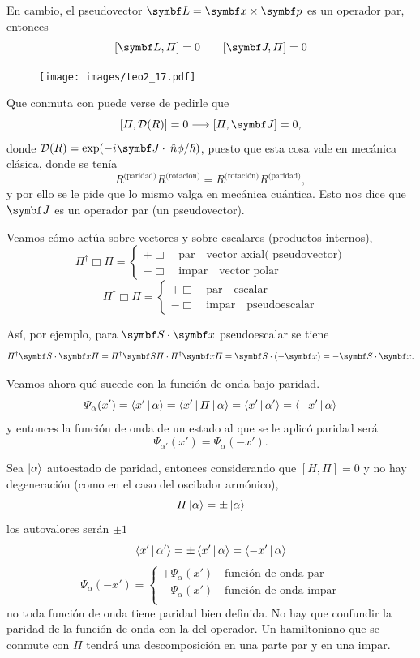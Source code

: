 \documentclass[10pt,oneside]{CBFT_book}
\begin{document}
En cambio, el pseudovector $\vb{L}=\vb{x}\times\vb{p}$ es un operador par, entonces 
\[
	[\vb{L},\Pi] = 0 \qquad [\vb{J},\Pi] = 0
\]
\begin{figure}[htb]
	\begin{center}
	\texttt{[image: images/teo2\_17.pdf]}
	\end{center}
	\caption{}
\end{figure} 
Que conmuta con  puede verse de pedirle que 
\[
	[\Pi,\mathcal{D}(R)] = 0 \longrightarrow [\Pi,\vb{J}] = 0 ,
\]
donde $\mathcal{D}(R) = \exp(- i \vb J \cdot \nver \phi / \hbar)$, puesto que esta cosa vale en 
mecánica clásica, donde se tenía
\[
	R^{\text{(paridad)}}R^{\text{(rotación)}} = R^{\text{(rotación)}} R^{\text{(paridad)}},
\]
y por ello se le pide que lo mismo valga en mecánica cuántica.
Esto nos dice que $\vb J$ es un operador par (un pseudovector).

Veamos cómo actúa sobre vectores y sobre escalares (productos internos),
\[
	\Pi^\dagger \Box \Pi =  \begin{cases} +{\Box} \quad \text{par}\quad\text{vector axial( 
	pseudovector)}\\  -\Box \quad \text{impar} \quad \text{vector polar} \end{cases}
\]
\[
	\Pi^\dagger \Box \Pi =  \begin{cases} +\Box \quad \text{par}\quad\text{escalar}\\
	-\Box \quad \text{impar} \quad \text{pseudoescalar} \end{cases}
\]

Así, por ejemplo, para $\vb{S}\cdot\vb{x}$ pseudoescalar se tiene
\[
	\Pi^\dagger \vb{S}\cdot\vb{x} \Pi = \Pi^\dagger \vb{S}\Pi \cdot\Pi^\dagger\vb{x} \Pi =
	\vb{S}\cdot(-\vb{x}) = -\vb{S}\cdot\vb{x}.
\]

Veamos ahora qué sucede con la función de onda bajo paridad.
\[
	\Psi_\alpha(x') = \Braket{x'|\alpha} = \Braket{x'|\Pi|\alpha} = \Braket{x'|\alpha'} = 
	\Braket{-x'|\alpha}
\]
y entonces la función de onda de un estado al que se le aplicó paridad será 
\[
	\Psi_{\alpha'}(x') = \Psi_\alpha(-x').
\]

Sea $\Ket{\alpha}$ autoestado de paridad, entonces considerando que $ [ H, \Pi] = 0 $ y no hay
degeneración (como en el caso del oscilador armónico),
\[
	\Pi\Ket{\alpha} = \pm \Ket{\alpha}
\]
los autovalores serán $\pm 1$
\[
	\Braket{x'|\alpha'} = \pm \Braket{x'|\alpha} = \Braket{-x'|\alpha} 
\]
\[
	\Psi_\alpha(-x') = \begin{cases} +\Psi_\alpha(x') \quad \text{función de onda par}\\ 
	-\Psi_\alpha(x') \quad \text{función de onda impar}\\ 
	\end{cases}
\]
no toda función de onda tiene paridad bien definida.
No hay que confundir la paridad de la función de onda con la del operador.
Un hamiltoniano que se conmute con $\Pi$ tendrá una descomposición en una parte par y en una impar.
\end{document}
